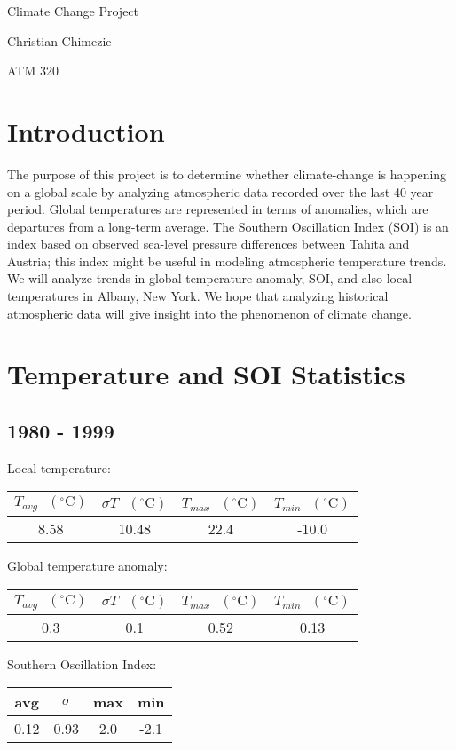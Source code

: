 \documentclass[12pt]{article}
\begin{document}
{\LARGE Climate Change Project}

{\large Christian Chimezie}

{\large ATM 320}

\noindent\makebox[\linewidth]{\rule{16.51cm}{0.4pt}}

\section*{Introduction}
The purpose of this project is to determine whether climate-change is
happening on a global scale by analyzing atmospheric data recorded
over the last 40 year period.
Global temperatures are represented in terms of anomalies,
which are departures from a long-term average.
The Southern Oscillation Index (SOI) is an index based on observed
sea-level pressure differences between Tahita and Austria;
this index might be useful in modeling atmospheric temperature
trends.
We will analyze trends in global temperature anomaly, SOI, and also
local temperatures in Albany, New York.
We hope that analyzing historical atmospheric data will give insight
into the phenomenon of climate change.

\section*{Temperature and SOI Statistics}
\subsection*{1980 - 1999}
Local temperature:
\begin{center}
\begin{tabular}{c | c | c | c}
	$T_{avg} \textrm{ } (^{\circ} \textrm{C})$ &
	$\sigma T \textrm{ } (^{\circ} \textrm{C})$ &
	$T_{max} \textrm{ } (^{\circ} \textrm{C})$ &
	$T_{min} \textrm{ } (^{\circ} \textrm{C})$ \\ %
	\hline
	8.58 & 10.48 & 22.4 & -10.0 \\ %
\end{tabular}
\end{center}
Global temperature anomaly:
\begin{center}
\begin{tabular}{c | c | c | c}
	$T_{avg} \textrm{ } (^{\circ} \textrm{C})$ &
	$\sigma T \textrm{ } (^{\circ} \textrm{C})$ &
	$T_{max} \textrm{ } (^{\circ} \textrm{C})$ &
	$T_{min} \textrm{ } (^{\circ} \textrm{C})$ \\ %
	\hline
	0.3 & 0.1 & 0.52 & 0.13 \\ %
\end{tabular}
\end{center}
Southern Oscillation Index:
\begin{center}
\begin{tabular}{c | c | c | c}
	avg & $\sigma$ & max & min \\ %
	\hline
	0.12 & 0.93 & 2.0 & -2.1 \\ %
\end{tabular}
\end{center}
\end{document}
